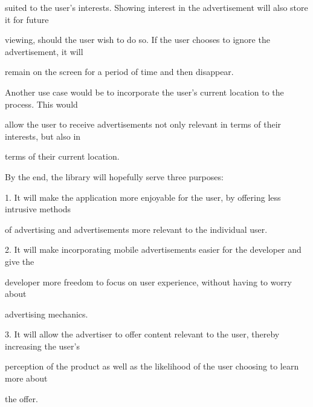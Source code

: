\begin{abstracts}
suited to the user’s interests. Showing interest in the advertisement will also store it for future

viewing, should the user wish to do so. If the user chooses to ignore the advertisement, it will

remain on the screen for a period of time and then disappear.

Another use case would be to incorporate the user’s current location to the process. This would

allow the user to receive advertisements not only relevant in terms of their interests, but also in

terms of their current location.

By the end, the library will hopefully serve three purposes:

1. It will make the application more enjoyable for the user, by offering less intrusive methods

of advertising and advertisements more relevant to the individual user.

2. It will make incorporating mobile advertisements easier for the developer and give the

developer more freedom to focus on user experience, without having to worry about

advertising mechanics.

3. It will allow the advertiser to offer content relevant to the user, thereby increasing the user’s

perception of the product as well as the likelihood of the user choosing to learn more about

the offer.




\end{abstracts}


